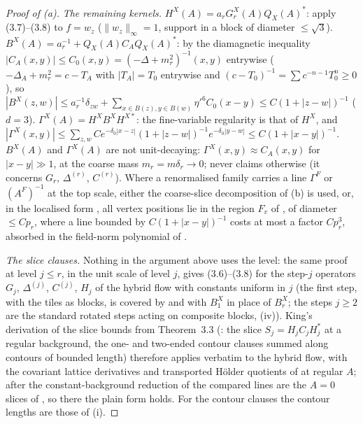 \begin{proof}[Proof of (a)]
\emph{The remaining kernels.} $H^X(A)=a_rG^X_r(A)Q_X(A)^*$: apply (3.7)--(3.8) to $f=w_z$ ($\|w_z\|_\infty=1$, support in a block of diameter $\le\sqrt3$). $B^X(A)=a_r^{-1}+Q_X(A)C_AQ_X(A)^*$: by the diamagnetic inequality $|C_A(x,y)|\le C_0(x,y)=(-\Delta+m_r^2)^{-1}(x,y)$ entrywise ($-\Delta_A+m_r^2=c-T_A$ with $|T_A|=T_0$ entrywise and $(c-T_0)^{-1}=\sum c^{-n-1}T_0^n\ge0$), so $|B^X(z,w)|\le a_r^{-1}\delta_{zw}+\sum_{x\in B(z),y\in B(w)}\eta'^6C_0(x-y)\le C(1+|z-w|)^{-1}$ ($d=3$). $\Gamma^X(A)=H^XB^XH^{X*}$: the fine-variable regularity is that of $H^X$, and $|\Gamma^X(x,y)|\le\sum_{z,w}Ce^{-\delta_0|x-z|}(1+|z-w|)^{-1}e^{-\delta_0|y-w|}\le C(1+|x-y|)^{-1}$. $B^X(A)$ and $\Gamma^X(A)$ are not unit-decaying: $\Gamma^X(x,y)\approx C_A(x,y)$ for $|x-y|\gg1$, at the coarse mass $m_r=m\delta_r\to0$; \cite[Thm.~3.3]{K1} never claims otherwise (it concerns $G_r$, $\Delta^{(r)}$, $C^{(r)}$). Where a renormalised family carries a line $\Gamma^F$ or $(A^F)^{-1}$ at the top scale, either the coarse-slice decomposition of (b) is used, or, in the localised form \cite[(3.55)]{K1}, all vertex positions lie in the region $F_v$ of , of diameter $\le Cp_r$, where a line bounded by $C(1+|x-y|)^{-1}$ costs at most a factor $Cp_r^3$, absorbed in the field-norm polynomial of .

\emph{The slice clauses.} Nothing in the argument above uses the level: the same proof at level $j\le r$, in the unit scale of level $j$, gives (3.6)--(3.8) for the step-$j$ operators $G_j$, $\Delta^{(j)}$, $C^{(j)}$, $H_j$ of the hybrid flow with constants uniform in $j$ (the first step, with the tiles as blocks, is covered by  and  with $B^X_1$ in place of $B^X_r$; the steps $j\ge2$ are the standard rotated steps acting on composite blocks, (iv)). King's derivation of the slice bounds \cite[(3.63)--(3.65)]{K1} from Theorem~3.3 (\cite[Prop.~3.7]{K1}: the slice $S_j=H_jC_jH_j^*$ at a regular background, the one- and two-ended contour clauses summed along contours of bounded length) therefore applies verbatim to the hybrid flow, with the covariant lattice derivatives and transported H\"older quotients of \cite[(2.10)--(2.11)]{Ba3} at regular $A$; after the constant-background reduction of  the compared lines are the $A=0$ slices of , so there the plain form holds. For the contour clauses the contour lengths are those of (i).


\end{proof}
